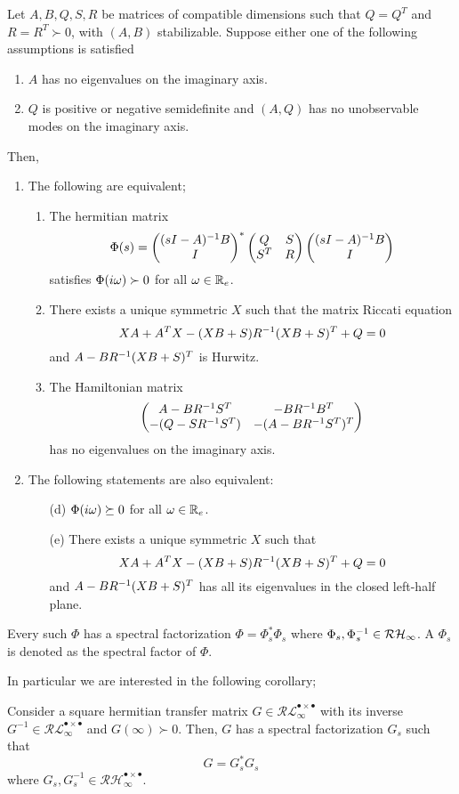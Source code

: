 \begin{thm}\label{thm:zhouspecfact}Let $A,B,Q,S,R$ be matrices of compatible dimensions such that $Q=Q^T$ and $R=R^T\succ 0$, with
$(A,B)$ stabilizable. Suppose either one of the following assumptions is satisfied
\begin{enumerate}[label=(A\arabic*)]
	\item $A$ has no eigenvalues on the imaginary axis.
	\item $Q$ is positive or negative semidefinite and $(A,Q)$ has no unobservable modes on the imaginary axis.
\end{enumerate}
Then,
\begin{enumerate}[label=(\Roman*)] 
\item The following are equivalent;
  \begin{enumerate}[label=(\alph*)]
		\item The hermitian matrix 
		\[
		\Phi(s) = \begin{pmatrix}(sI-A)^{-1}B\\ I\end{pmatrix}^*\begin{pmatrix}Q&S\\S^T&R\end{pmatrix}\begin{pmatrix}(sI-A)^{-1}B\\ I\end{pmatrix}
		\]
		satisfies $\Phi(i\omega)\succ 0$ for all $\omega\in\mathbb{R}_e$.
		\item There exists a unique symmetric $X$ such that the matrix Riccati equation
		\[
		XA + A^TX - (XB+S)R^{-1}(XB+S)^T + Q = 0
		\]
		and $A-BR^{-1}(XB+S)^T$ is Hurwitz.
		\item The Hamiltonian matrix 
		\[
		\begin{pmatrix}A-BR^{-1}S^T & -BR^{-1}B^T\\-(Q-SR^{-1}S^T) &-(A-BR^{-1}S^T)^T\end{pmatrix}
		\]
		has no eigenvalues on the imaginary axis. 
		\end{enumerate}
		\item The following statements are also equivalent:
		\begin{enumerate}
		\item[(d)] $\Phi(i\omega) \succeq 0$ for all $\omega\in\mathbb{R}_e$.
		\item[(e)] There exists a unique symmetric $X$ such that 
		\[
		XA + A^TX - (XB+S)R^{-1}(XB+S)^T + Q = 0
		\]
		and $A-BR^{-1}(XB+S)^T$ has all its eigenvalues in the closed left-half plane.
		\end{enumerate}
\end{enumerate}
Every such $\Phi$ has a spectral factorization $\Phi = \Phi_s^*\Phi_s$ where $\Phi_s,\Phi_s^{-1}\in\mathcal{RH}_\infty$. 
A $\Phi_s$ is denoted as the spectral factor of $\Phi$. 
\end{thm}
In particular we are interested in the following corollary;
\begin{coroll} Consider a square hermitian transfer matrix $G\in\mathcal{RL}_\infty^{\bullet\times\bullet}$ with its inverse
$G^{-1}\in\mathcal{RL}_\infty^{\bullet\times\bullet}$ and $G(\infty)\succ 0$. Then, $G$ has a spectral factorization $G_s$ such that
\[
G = G_s^*G_s
\]
where $G_s,G_s^{-1}\in\mathcal{RH}_\infty^{\bullet\times\bullet}$.
\end{coroll}


